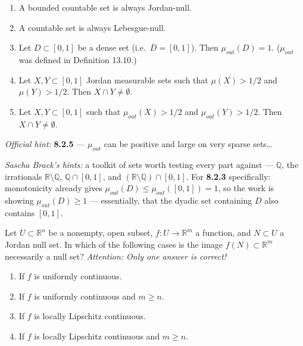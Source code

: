\begin{exercise}
\label{ex:8.2}
\begin{enumerate}[label=\textbf{\arabic*.}]
  \item A bounded countable set is always Jordan-null.
  \item A countable set is always Lebesgue-null.
  \item Let $D \subset [0,1]$ be a dense set (i.e.\ $\overline D = [0,1]$). Then
    $\mu_{out}(D) = 1$. ($\mu_{out}$ was defined in Definition 13.10.)
  \item Let $X, Y \subset [0,1]$ Jordan measurable sets such that $\mu(X) > 1/2$ and
    $\mu(Y) > 1/2$. Then $X \cap Y \neq \emptyset$.
  \item Let $X, Y \subset [0,1]$ such that $\mu_{out}(X) > 1/2$ and $\mu_{out}(Y) > 1/2$. Then
    $X \cap Y \neq \emptyset$.
\end{enumerate}
\textit{Official hint:} \textbf{8.2.5} --- $\mu_{out}$ can be positive and large on very sparse
sets\dots

\textit{Sascha Brack's hints:} a toolkit of sets worth testing every part against ---
$\mathbb{Q}$, the irrationals $\mathbb{R}\setminus\mathbb{Q}$, $\mathbb{Q}\cap[0,1]$, and
$(\mathbb{R}\setminus\mathbb{Q})\cap[0,1]$. For \textbf{8.2.3} specifically: monotonicity already
gives $\mu_{out}(D) \leq \mu_{out}([0,1]) = 1$, so the work is showing
$\mu_{out}(D) \geq 1$ --- essentially, that the  dyadic set containing $D$ also
contains $[0,1]$.
\end{exercise}

\begin{exercise}
\label{ex:8.4}
Let $U \subset \mathbb{R}^n$ be a nonempty, open subset, $f : U \to \mathbb{R}^m$ a function,
and $N \subset U$ a Jordan null set. In which of the following cases is the image
$f(N) \subset \mathbb{R}^m$ necessarily a null set? \textit{Attention: Only one answer is
correct!}
\begin{enumerate}[label=\textbf{\arabic*.}]
  \item If $f$ is uniformly continuous.
  \item If $f$ is uniformly continuous and $m \geq n$.
  \item If $f$ is locally Lipschitz continuous.
  \item If $f$ is locally Lipschitz continuous and $m \geq n$.
\end{enumerate}
\end{exercise}

